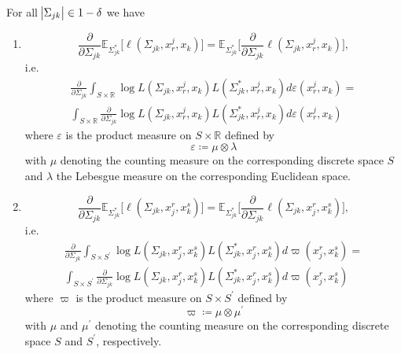 \begin{lemma}\label{expectation_commutes_case2}
    For all $\abs{\Sigma_{jk}} \in 1-\delta$ we have
    \begin{enumerate}
        \item \begin{equation*}
                \frac{\partial }{\partial \Sigma_{jk}} \mathbb{E}_{\Sigma_{jk}^*} \big[\ell(\Sigma_{jk}, x_r^j,x_k)\big] = \mathbb{E}_{\Sigma_{jk}^*} \Bigg[\frac{\partial }{\partial \Sigma_{jk}} \ell(\Sigma_{jk}, x_r^j,x_k) \Bigg], 
               \end{equation*}
                i.e. 
               \begin{align*}
                    \frac{\partial }{\partial \Sigma_{jk}} \int_{S\times \mathbb{R}} \log L(\Sigma_{jk}, x_r^j,x_k) L(\Sigma_{jk}^*, x_r^j,x_k) d\varepsilon(x_r^j,x_k) = \\
                    \int_{S\times \mathbb{R}} \frac{\partial }{\partial \Sigma_{jk}} \log L(\Sigma_{jk}, x_r^j,x_k) L(\Sigma_{jk}^*, x_r^j,x_k) d\varepsilon(x_r^j,x_k)
               \end{align*}
               where $\varepsilon$ is the product measure on $S \times \mathbb{R}$ defined by
               \begin{equation*}
                    \varepsilon \coloneqq \mu \otimes \lambda
               \end{equation*}
               with $\mu$ denoting the counting measure on the corresponding discrete space $S$ and $\lambda$ the Lebesgue measure on the corresponding Euclidean space.  
    \item \begin{equation*}
                \frac{\partial }{\partial \Sigma_{jk}} \mathbb{E}_{\Sigma_{jk}^*} \big[\ell(\Sigma_{jk}, x_j^r,x_k^s)\big] = \mathbb{E}_{\Sigma_{jk}^*} \Bigg[\frac{\partial }{\partial \Sigma_{jk}} \ell(\Sigma_{jk}, x_j^r,x_k^s) \Bigg], 
           \end{equation*}
           i.e. 
               \begin{align*}
                    \frac{\partial }{\partial \Sigma_{jk}} \int_{S\times S^\prime} \log L(\Sigma_{jk}, x_j^r,x_k^s) L(\Sigma_{jk}^*, x_j^r,x_k^s) d\varpi(x_j^r,x_k^s) = \\
                    \int_{S\times S^\prime} \frac{\partial }{\partial \Sigma_{jk}} \log L(\Sigma_{jk}, x_j^r,x_k^s) L(\Sigma_{jk}^*, x_j^r,x_k^s) d\varpi(x_j^r,x_k^s)
               \end{align*}
               where $\varpi$ is the product measure on $S \times S^\prime$ defined by
               \begin{equation*}
                    \varpi \coloneqq \mu \otimes \mu^\prime
               \end{equation*}
               with $\mu$ and $\mu^\prime$ denoting the counting measure on the corresponding discrete space $S$ and $S^\prime$, respectively.
    \end{enumerate}
    

\end{lemma}
